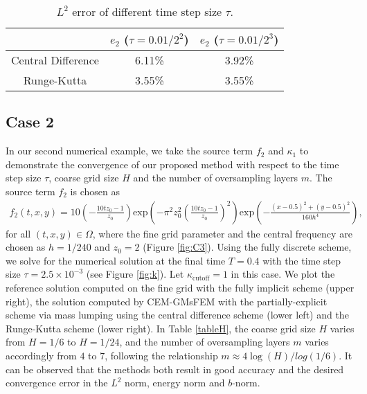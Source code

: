 \documentclass[preprint,12pt]{elsarticle}
\begin{document}
 \begin{table}[H]
\centering
\begin{tabular}{c|c|c}
~ & $e_2$ ($\tau =0.01/2^2$)  & $e_2$ ($\tau =0.01/2^3$) \\
\hline
Central Difference& 6.11\%  & 3.92\% \\
\hline
Runge-Kutta & 3.55\%& 3.55\% \\
\hline
\end{tabular}
\caption{$L^2$ error of different time step size $\tau$.}
 \label{tablec0}
\end{table}
\subsection{Case 2}
In our second numerical example, we take the source term $f_2$ and $\kappa_1$ to demonstrate the convergence of our proposed method with respect to the time step size $\tau$, coarse grid size $H$ and the number of oversampling layers $m$. 
The source term $f_2$ is chosen as 
\begin{equation}\label{f2}
\begin{aligned}
f_2(t,x,y)=10\left(-\frac{10tz_0-1}{z_0}\right)\mathrm{exp}\left(-\pi^2z_0^2\left(\frac{10tz_0-1}{z_0}\right)^2\right)\mathrm{exp}\left(-\frac{(x-0.5)^2+(y-0.5)^2}{160h^4}\right),
\end{aligned}
\end{equation}
for all $(t,x,y)\in \Omega$, where the fine grid parameter and the central frequency are chosen as $h=1/240$ and $z_0=2$ (Figure \ref{fig:C3}). Using the fully discrete scheme, we solve for the numerical solution at the final time $T=0.4$ with the time step size $\tau=2.5\times10^{-3}$ (see Figure \ref{fig:k}). Let $\kappa_{\text{cutoff}}=1$ in this case.  We plot the reference solution computed on the fine grid with the fully implicit scheme (upper right), the solution computed by CEM-GMsFEM with the partially-explicit scheme via mass lumping using the central difference scheme (lower left) and the Runge-Kutta scheme (lower right). In Table \ref{tableH}, the coarse grid size $H$ varies from $H=1/6$ to $H=1/24$, and the number of oversampling layers $m$ varies accordingly from $4$ to $7$, following the relationship $m\approx4\log(H)/log(1/6)$. It can be observed that the methods both result in good accuracy and the desired convergence error in the $L^2$ norm, energy norm and $b$-norm. 
\end{document}
